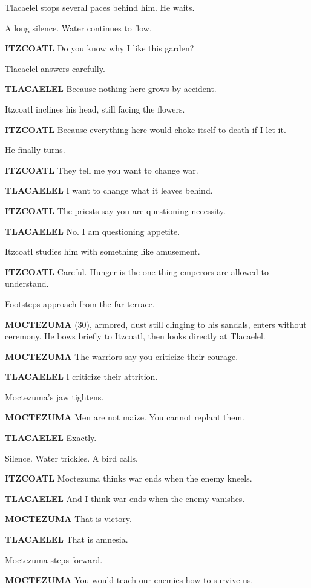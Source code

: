 \documentclass[12pt]{article}
\begin{document}
Tlacaelel stops several paces behind him. He waits.

A long silence. Water continues to flow.

\textbf{ITZCOATL}  
Do you know why I like this garden?

Tlacaelel answers carefully.

\textbf{TLACAELEL}  
Because nothing here grows by accident.

Itzcoatl inclines his head, still facing the flowers.

\textbf{ITZCOATL}  
Because everything here would choke itself to death  
if I let it.

He finally turns.

\textbf{ITZCOATL}  
They tell me you want to change war.

\textbf{TLACAELEL}  
I want to change what it leaves behind.

\textbf{ITZCOATL}  
The priests say you are questioning necessity.

\textbf{TLACAELEL}  
No. I am questioning appetite.

Itzcoatl studies him with something like amusement.

\textbf{ITZCOATL}  
Careful. Hunger is the one thing emperors  
are allowed to understand.

Footsteps approach from the far terrace.

\textbf{MOCTEZUMA} (30), armored, dust still clinging to his sandals, enters without ceremony. He bows briefly to Itzcoatl, then looks directly at Tlacaelel.

\textbf{MOCTEZUMA}  
The warriors say you criticize their courage.

\textbf{TLACAELEL}  
I criticize their attrition.

Moctezuma’s jaw tightens.

\textbf{MOCTEZUMA}  
Men are not maize. You cannot replant them.

\textbf{TLACAELEL}  
Exactly.

Silence. Water trickles. A bird calls.

\textbf{ITZCOATL}  
Moctezuma thinks war ends when the enemy kneels.

\textbf{TLACAELEL}  
And I think war ends when the enemy vanishes.

\textbf{MOCTEZUMA}  
That is victory.

\textbf{TLACAELEL}  
That is amnesia.

Moctezuma steps forward.

\textbf{MOCTEZUMA}  
You would teach our enemies how to survive us.
\end{document}
